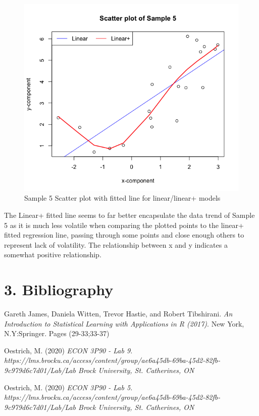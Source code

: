 \documentclass{article}
\begin{document}
\begin{figure}[!htb]
\caption{Sample 5 Scatter plot with fitted line for linear/linear+ models}
\label{returns_microsoft}
\begin{center}
\includegraphics[scale=0.8]{sample5.png}
\end{center}
\end{figure}
The Linear+ fitted line seems to far better encapsulate the data trend of Sample 5 as it is much less volatile when comparing the plotted points to the linear+ fitted regression line, passing through some points and close enough others to represent lack of volatility. The relationship between x and y indicates a somewhat positive relationship.
\newpage
\section*{3. \space Bibliography}
\begin{thebibliography}{9}
Gareth James, Daniela Witten, Trevor Hastie, and Robert Tibshirani. 
\textit{An Introduction to Statistical Learning with Applications in R (2017)}. 
New York, N.Y:Springer. Pages (29-33;33-37)

Oestrich, M. (2020) 
\textit{ECON 3P90 - Lab 9. https://lms.brocku.ca/access/content/group/ae6a45db-69ba-45d2-82fb-9c979d6c7d01/Lab/Lab%
Brock University, St. Catherines, ON}

Oestrich, M. (2020) 
\textit{ECON 3P90 - Lab 5. https://lms.brocku.ca/access/content/group/ae6a45db-69ba-45d2-82fb-9c979d6c7d01/Lab/Lab%
Brock University, St. Catherines, ON}
\end{thebibliography}
\end{document}
